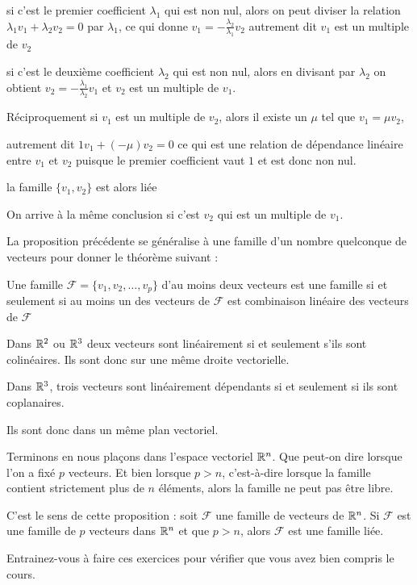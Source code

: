 \change
si c'est le premier coefficient $\lambda_1$ qui est non nul, alors on peut diviser la relation $\lambda_1 v_1+\lambda_2 v_2= 0$ par $\lambda_1$, ce qui donne 
$ v_1=-\frac{\lambda_2}{\lambda_1} v_2$ autrement dit $ v_1$ est un multiple de $v_2$

\change
si c'est le deuxi\`eme coefficient $\lambda_2$ qui est non nul, alors en divisant par $\lambda_2$ on obtient $ v_2=-\frac{\lambda_1}{\lambda_2} v_1$ et $v_2$ est un multiple de $ v_1$. 


\change
Réciproquement si $ v_1$ est un multiple de $ v_2$, alors il
existe un  $\mu$ tel que $ v_1=\mu  v_2$, 

\change
autrement dit $1 v_1+(-\mu)
v_2= 0$
ce qui est une relation de dépendance linéaire entre $v_1$ et $ v_2$ 
puisque le premier coefficient vaut $1$ et est donc non nul. 

\change
la famille $\{ v_1, v_2\}$ est alors liée

\change
On arrive à la m\^eme conclusion si c'est $v_2$ qui est un multiple de $ v_1$.

\diapo
La proposition précédente se généralise à une famille d'un nombre quelconque de vecteurs pour donner le théor\`eme suivant :

\change
Une famille $\mathcal{F}=\{v_1, v_2,\ldots, v_p\}$  d'au moins deux vecteurs
est une famille  si et seulement si 
au moins un des vecteurs de $\mathcal{F}$ est combinaison linéaire 
des  vecteurs de $\mathcal{F}$

\diapo
Dans $\mathbb{R}^2$ ou $\mathbb{R}^3$  deux vecteurs sont linéairement  si et seulement s'ils sont colinéaires.
Ils sont donc sur une même droite vectorielle.


\change
Dans $\mathbb{R}^3$, trois vecteurs sont linéairement dépendants si et seulement si ils sont coplanaires.

\change
Ils sont donc dans un même plan vectoriel.

\change
Terminons en nous plaçons dans l'espace vectoriel $\mathbb{R}^n$.
Que peut-on dire lorsque l'on a fixé $p$ vecteurs. 
Et bien lorsque $p > n$, c'est-à-dire lorsque la famille 
 contient strictement plus de $n$ éléments, alors la famille ne peut pas être libre.
 
 C'est le sens de cette proposition :
  soit $\mathcal{F}$ une famille de vecteurs de $\mathbb{R}^n$. Si $\mathcal{F}$ est une famille
   de $p$ vecteurs dans $\mathbb{R}^n$ et que $p > n$, alors 
  $\mathcal{F}$ est une famille liée.
 

\diapo

Entrainez-vous à faire ces exercices pour vérifier que vous avez bien compris le cours.


